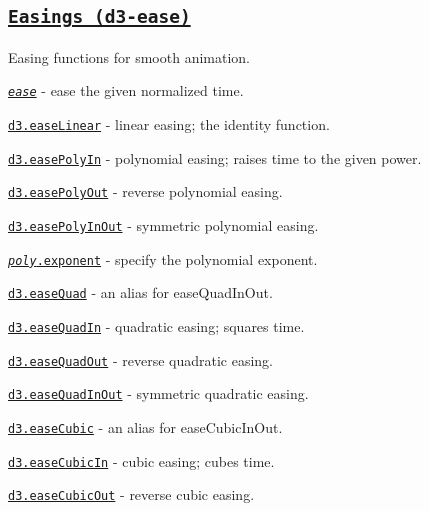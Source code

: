 \subsection*{\href{https://github.com/d3/d3-ease}{\tt Easings (d3-\/ease)}}

Easing functions for smooth animation.


\begin{DoxyItemize}
\item \href{https://github.com/d3/d3-ease/blob/master/README.md#_ease}{\tt {\itshape ease}} -\/ ease the given normalized time.
\item \href{https://github.com/d3/d3-ease/blob/master/README.md#easeLinear}{\tt d3.\+ease\+Linear} -\/ linear easing; the identity function.
\item \href{https://github.com/d3/d3-ease/blob/master/README.md#easePolyIn}{\tt d3.\+ease\+Poly\+In} -\/ polynomial easing; raises time to the given power.
\item \href{https://github.com/d3/d3-ease/blob/master/README.md#easePolyOut}{\tt d3.\+ease\+Poly\+Out} -\/ reverse polynomial easing.
\item \href{https://github.com/d3/d3-ease/blob/master/README.md#easePolyInOut}{\tt d3.\+ease\+Poly\+In\+Out} -\/ symmetric polynomial easing.
\item \href{https://github.com/d3/d3-ease/blob/master/README.md#poly_exponent}{\tt {\itshape poly}.exponent} -\/ specify the polynomial exponent.
\item \href{https://github.com/d3/d3-ease/blob/master/README.md#easeQuad}{\tt d3.\+ease\+Quad} -\/ an alias for ease\+Quad\+In\+Out.
\item \href{https://github.com/d3/d3-ease/blob/master/README.md#easeQuadIn}{\tt d3.\+ease\+Quad\+In} -\/ quadratic easing; squares time.
\item \href{https://github.com/d3/d3-ease/blob/master/README.md#easeQuadOut}{\tt d3.\+ease\+Quad\+Out} -\/ reverse quadratic easing.
\item \href{https://github.com/d3/d3-ease/blob/master/README.md#easeQuadInOut}{\tt d3.\+ease\+Quad\+In\+Out} -\/ symmetric quadratic easing.
\item \href{https://github.com/d3/d3-ease/blob/master/README.md#easeCubic}{\tt d3.\+ease\+Cubic} -\/ an alias for ease\+Cubic\+In\+Out.
\item \href{https://github.com/d3/d3-ease/blob/master/README.md#easeCubicIn}{\tt d3.\+ease\+Cubic\+In} -\/ cubic easing; cubes time.
\item \href{https://github.com/d3/d3-ease/blob/master/README.md#easeCubicOut}{\tt d3.\+ease\+Cubic\+Out} -\/ reverse cubic easing.

\end{DoxyItemize}
